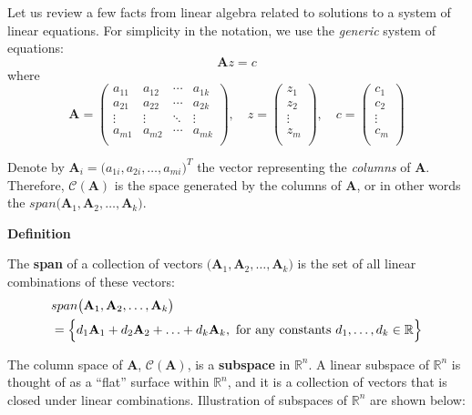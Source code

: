 \documentclass[
]{book}
\begin{document}
Let us review a few facts from linear algebra related to solutions to a system of linear equations. For simplicity in the notation, we use the \emph{generic} system of equations:
\[\mathbf{A} z = c\]
where
\[ \mathbf{A}=\left(\begin{array}{cccc}
    a_{11} & a_{12} & \cdots & a_{1k} \\
    a_{21} & a_{22} & \cdots & a_{2k}   \\
      \vdots & \vdots & \ddots & \vdots\\
  a_{m1} & a_{m2} & \cdots & a_{mk}  \\
    \end{array} \right),\quad
    z =\left(\begin{array}{c}
    z_{1} \\
    z_{2}   \\
   \vdots\\
    z_{m}  \\
    \end{array} \right),\quad
    c =\left(\begin{array}{c}
    c_{1} \\
    c_{2}   \\
   \vdots\\
    c_{m}  \\
    \end{array} \right)
    \]

Denote by \(\mathbf{A}_{i} = \bigl( a_{1i}, a_{2i}, \ldots, a_{mi}\bigr)^T\) the vector representing the \emph{columns} of \(\mathbf{A}\). Therefore, \(\mathcal{C}(\mathbf{A})\) is the space generated by the columns of \(\mathbf{A}\), or in other words the \(span \bigl(\mathbf{A}_1, \mathbf{A}_2, \ldots, \mathbf{A}_{k}\bigr)\).

\textbf{Definition}

The \textbf{span} of a collection of vectors \(\bigl(\mathbf{A}_1, \mathbf{A}_2, \ldots, \mathbf{A}_{k}\bigr)\) is the set of all linear combinations of these vectors:
\begin{align*}
&span \bigl(\mathbf{A}_1, \mathbf{A}_2, \ldots, \mathbf{A}_{k}\bigr) \\
&= \Bigl\{ d_1 \mathbf{A}_1 + d_2 \mathbf{A}_2 + \ldots + d_k \mathbf{A}_{k}, \text{ for any constants } d_1, \ldots, d_k \in \mathbb{R}
\Bigr\}
\end{align*}

The column space of \(\mathbf{A}\), \(\mathcal{C}(\mathbf{A})\), is a \textbf{subspace} in \(\mathbb{R}^n\). A linear subspace of \(\mathbb{R}^n\) is thought of as a ``flat'' surface within \(\mathbb{R}^n\), and it is a collection of vectors that is closed under linear combinations. Illustration of subspaces of \(\mathbb{R}^n\) are shown below:
\end{document}

